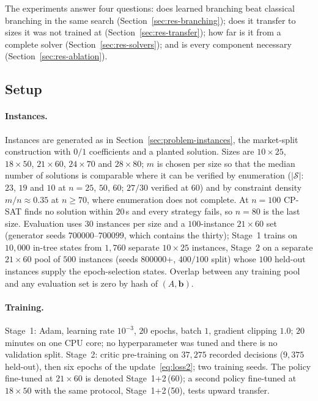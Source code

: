 \documentclass[final,5p,times,twocolumn,authoryear]{elsarticle}
\newcommand{\SOL}{\mathcal{S}}
\begin{document}
The experiments answer four questions: does learned branching beat classical branching in the same search (Section~\ref{sec:res-branching}); does it transfer to sizes it was not trained at (Section~\ref{sec:res-transfer}); how far is it from a complete solver (Section~\ref{sec:res-solvers}); and is every component necessary (Section~\ref{sec:res-ablation}).

\subsection{Setup}
\label{sec:exp-setup}

\paragraph{Instances.} Instances are generated as in Section~\ref{sec:problem-instances}, the market-split construction with $0/1$ coefficients and a planted solution. Sizes are $10\times25$, $18\times50$, $21\times60$, $24\times70$ and $28\times80$; $m$ is chosen per size so that the median number of solutions is comparable where it can be verified by enumeration ($|\SOL|$: $23$, $19$ and $10$ at $n=25$, $50$, $60$; $27/30$ verified at $60$) and by constraint density $m/n\approx0.35$ at $n\ge70$, where enumeration does not complete. At $n=100$ CP-SAT finds no solution within $20$\,s and every strategy fails, so $n=80$ is the last size. Evaluation uses $30$ instances per size and a $100$-instance $21\times60$ set (generator seeds $700000$--$700099$, which contains the thirty); Stage~1 trains on $10{,}000$ in-tree states from $1{,}760$ separate $10\times25$ instances, Stage~2 on a separate $21\times60$ pool of $500$ instances (seeds $800000$+, $400/100$ split) whose $100$ held-out instances supply the epoch-selection states. Overlap between any training pool and any evaluation set is zero by hash of $(A,\mathbf{b})$.

\paragraph{Training.} Stage~1: Adam, learning rate $10^{-3}$, $20$ epochs, batch $1$, gradient clipping $1.0$; $20$ minutes on one CPU core; no hyperparameter was tuned and there is no validation split. Stage~2: critic pre-training on $37{,}275$ recorded decisions ($9{,}375$ held-out), then six epochs of the update~\eqref{eq:loss2}; two training seeds. The policy fine-tuned at $21\times60$ is denoted Stage~1+2\,(60); a second policy fine-tuned at $18\times50$ with the same protocol, Stage~1+2\,(50), tests upward transfer.
\end{document}
